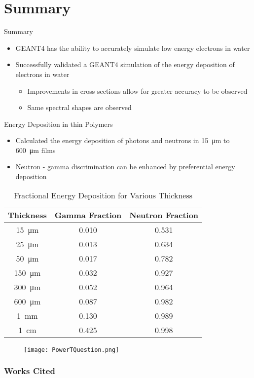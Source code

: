 \documentclass[compress]{beamer}
\begin{document}
\section{Summary}
\begin{frame}{Summary}
  \begin{itemize}
    \item GEANT4 has the ability to accurately simulate low energy electrons in water
    \item Successfully validated a GEANT4 simulation of the energy deposition of electrons in water
    \begin{itemize}
      \item Improvements in cross sections allow for greater accuracy to be observed
      \item Same spectral shapes are observed
    \end{itemize}
  \end{itemize}
\end{frame}
\begin{frame}{Energy Deposition in thin Polymers}
  \begin{itemize}
    \item Calculated the energy deposition of  photons and neutrons in \SI{15}{\um} to \SI{600}{\um} films
    \item Neutron - gamma discrimination can be enhanced by preferential energy deposition
  \end{itemize}
  \begin{table}[ht]
      \caption{Fractional Energy Deposition for Various Thickness}
    \centering
    \begin{tabular}{c | c c}
    Thickness & Gamma Fraction & Neutron Fraction \\
    \hline
    \hline
    \SI{15}{\um} & 0.010 & 0.531 \\
    \SI{25}{\um} & 0.013 & 0.634 \\
    \SI{50}{\um} & 0.017 & 0.782 \\
    \SI{150}{\um} & 0.032 & 0.927 \\
    \SI{300}{\um} & 0.052 & 0.964 \\
    \SI{600}{\um} & 0.087 & 0.982 \\
    \SI{1}{\mm} & 0.130 & 0.989 \\
    \SI{1}{\cm} & 0.425 & 0.998 \\
    \end{tabular}
    \label{tab:FractionEDep}
  \end{table}
\end{frame}
\begin{frame}{}
  \centering
  \begin{figure}
    \texttt{[image: PowerTQuestion.png]}
  \end{figure}
\end{frame}
\begin{frame}
\frametitle{Works Cited}
	\tiny
  
\end{frame}
\end{document}

